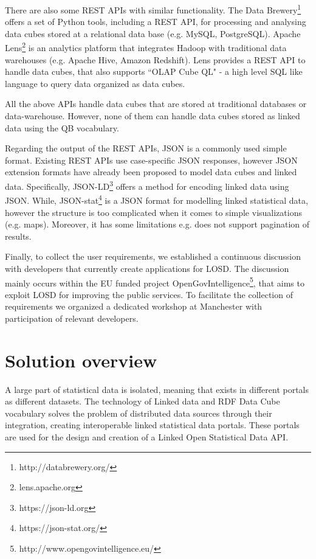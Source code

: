 \documentclass{llncs}
\begin{document}
There are also some REST APIs with similar functionality. The Data Brewery\footnote{http://databrewery.org/} offers a set of Python tools, including a REST API, for processing and analysing data cubes stored at a relational data base (e.g. MySQL, PostgreSQL). Apache Lens\footnote{lens.apache.org} is an analytics platform that integrates Hadoop with traditional data warehouses (e.g. Apache Hive, Amazon Redshift). Lens provides a REST API to handle data cubes, that also supports ``OLAP Cube QL" - a high level SQL like language to query data organized as data cubes.

All the above APIs handle data cubes that are stored at traditional databases or data-warehouse. However, none of them can handle data cubes  stored as linked data using the QB vocabulary.  

Regarding the output of the REST APIs, JSON is a commonly used simple format. Existing REST APIs use 
case-specific JSON responses, however JSON extension formats have already been proposed to model data cubes and linked data. Specifically, JSON-LD\footnote{https://json-ld.org} offers a method for encoding linked data using JSON. While, JSON-stat\footnote{https://json-stat.org/} is a JSON format for modelling linked statistical data, however the structure is too complicated when it comes to simple visualizations (e.g. maps). Moreover, it has some limitations e.g. does not support pagination of results. 

Finally, to collect the user requirements, we established a continuous discussion with developers that currently create applications for LOSD. The discussion mainly occurs within the EU funded project OpenGovIntelligence\footnote{http://www.opengovintelligence.eu/}, that aims to exploit LOSD for improving the public services. To facilitate the collection of requirements we organized a dedicated workshop at Manchester with participation of relevant developers. 

\section{Solution overview}\label{sec:overview}

A large part of statistical data is isolated, meaning that exists in different portals as different datasets. The technology of Linked data and RDF Data Cube vocabulary solves the problem of distributed data sources through their integration, creating interoperable linked statistical data portals. These portals are used for the design and creation of a Linked Open Statistical Data API. 
 
\end{document}
